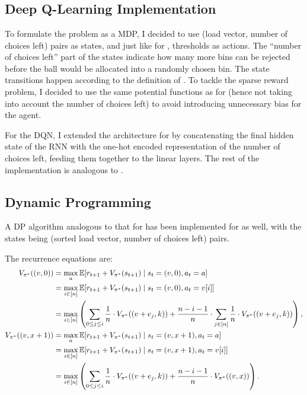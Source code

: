 \section{\KThinning}


\subsection{Deep Q-Learning Implementation}


To formulate the \KThinning problem as a MDP, I decided to use (load vector, number of choices left) pairs as states, and just like for \TwoThinning, thresholds as actions. The ``number of choices left'' part of the states indicate how many more bins can be rejected before the ball would be allocated into a randomly chosen bin. The state transitions happen according to the definition of \KThinning. To tackle the sparse reward problem, I decided to use the same potential functions as for \TwoThinning (hence not taking into account the number of choices left) to avoid introducing unnecessary bias for the agent.


For the DQN, I extended the architecture for \TwoThinning by concatenating the final hidden state of the RNN with the one-hot encoded representation of the number of choices left, feeding them together to the linear layers. The rest of the implementation is analogous to \TwoThinning.



\subsection{Dynamic Programming}


A DP algorithm analogous to that for \TwoThinning has been implemented for \KThinning as well, with the states being (sorted load vector, number of choices left) pairs.


The recurrence equations are:
\begin{align} 
    V_{\pi^*}((v, 0)) &= \max_a \mathbb{E} [r_{t+1} + V_{\pi^*}(s_{t+1}) \mid s_t=(v,0), a_t=a] \notag \\
    &= \max_{i \in [n]} \mathbb{E} [r_{t+1} + V_{\pi^*}(s_{t+1}) \mid s_t=(v,0), a_t=v[i]] \notag \\
    &= \max_{i \in [n]} \left(\sum_{0\leq j \leq i} \frac{1}{n}\cdot V_{\pi^*}((v+e_j,k)) + \frac{n-i-1}{n} \cdot  \sum_{j \in [n]} \frac{1}{n}\cdot V_{\pi^*}((v+e_j,k))\right), \label{eq:kthinning-dynamicprogramming} \\
    V_{\pi^*}((v, x+1)) &= \max_a \mathbb{E} [r_{t+1} + V_{\pi^*}(s_{t+1}) \mid s_t=(v,x+1), a_t=a] \notag \\
    &= \max_{i \in [n]} \mathbb{E} [r_{t+1} + V_{\pi^*}(s_{t+1}) \mid s_t=(v, x+1), a_t=v[i]] \notag \\
    &= \max_{i \in [n]} \left(\sum_{0\leq j \leq i} \frac{1}{n}\cdot V_{\pi^*}((v+e_j,k)) + \frac{n-i-1}{n} \cdot  V_{\pi^*}((v, x))\right).
\end{align}

